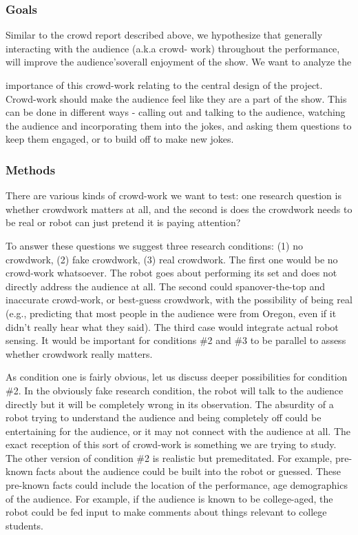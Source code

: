 \documentclass[onecolumn, draftclsnofoot,10pt, compsoc]{IEEEtran}
\begin{document}
\subsubsection{Goals}

Similar to the crowd report described above, we hypothesize that generally interacting with the audience (a.k.a crowd-
work) throughout the performance, will improve the audience’soverall enjoyment of the show. We want to analyze the

importance of this crowd-work relating to the central design of the project. Crowd-work should make the audience feel
like they are a part of the show. This can be done in different ways - calling out and talking to the audience, watching
the audience and incorporating them into the jokes, and asking them questions to keep them engaged, or to build off to
make new jokes.

\subsubsection{Methods}
There are various kinds of crowd-work we want to test: one research question is whether crowdwork matters at all, and
the second is does the crowdwork needs to be real or robot can just pretend it is paying attention?

To answer these questions we suggest three research conditions: (1) no crowdwork, (2) fake crowdwork, (3) real
crowdwork. The first one would be no crowd-work whatsoever. The robot goes about performing its set and does
not directly address the audience at all. The second could spanover-the-top and inaccurate crowd-work, or best-guess
crowdwork, with the possibility of being real (e.g., predicting that most people in the audience were from Oregon, even
if it didn’t really hear what they said). The third case would integrate actual robot sensing. It would be important for
conditions \#2 and \#3 to be parallel to assess whether crowdwork really matters.

As condition one is fairly obvious, let us discuss deeper possibilities for condition \#2. In the obviously fake research
condition, the robot will talk to the audience directly but it will be completely wrong in its observation. The absurdity
of a robot trying to understand the audience and being completely off could be entertaining for the audience, or it may
not connect with the audience at all. The exact reception of this sort of crowd-work is something we are trying to study.
The other version of condition \#2 is realistic but premeditated. For example, pre-known facts about the audience
could be built into the robot or guessed. These pre-known facts could include the location of the performance, age
demographics of the audience. For example, if the audience is known to be college-aged, the robot could be fed input
to make comments about things relevant to college students.
\end{document}
